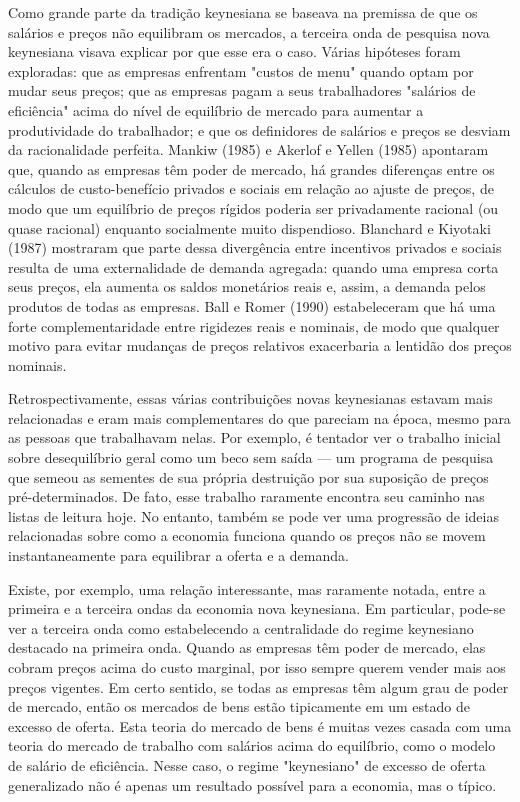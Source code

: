 \documentclass[12pt]{article}
\begin{document}
Como grande parte da tradição keynesiana se baseava na premissa de que os salários e preços não equilibram os mercados, a terceira onda de pesquisa nova keynesiana visava explicar por que esse era o caso. Várias hipóteses foram exploradas: que as empresas enfrentam "custos de menu" quando optam por mudar seus preços; que as empresas pagam a seus trabalhadores "salários de eficiência" acima do nível de equilíbrio de mercado para aumentar a produtividade do trabalhador; e que os definidores de salários e preços se desviam da racionalidade perfeita. Mankiw (1985) e Akerlof e Yellen (1985) apontaram que, quando as empresas têm poder de mercado, há grandes diferenças entre os cálculos de custo-benefício privados e sociais em relação ao ajuste de preços, de modo que um equilíbrio de preços rígidos poderia ser privadamente racional (ou quase racional) enquanto socialmente muito dispendioso. Blanchard e Kiyotaki (1987) mostraram que parte dessa divergência entre incentivos privados e sociais resulta de uma externalidade de demanda agregada: quando uma empresa corta seus preços, ela aumenta os saldos monetários reais e, assim, a demanda pelos produtos de todas as empresas. Ball e Romer (1990) estabeleceram que há uma forte complementaridade entre rigidezes reais e nominais, de modo que qualquer motivo para evitar mudanças de preços relativos exacerbaria a lentidão dos preços nominais.

Retrospectivamente, essas várias contribuições novas keynesianas estavam mais relacionadas e eram mais complementares do que pareciam na época, mesmo para as pessoas que trabalhavam nelas. Por exemplo, é tentador ver o trabalho inicial sobre desequilíbrio geral como um beco sem saída — um programa de pesquisa que semeou as sementes de sua própria destruição por sua suposição de preços pré-determinados. De fato, esse trabalho raramente encontra seu caminho nas listas de leitura hoje. No entanto, também se pode ver uma progressão de ideias relacionadas sobre como a economia funciona quando os preços não se movem instantaneamente para equilibrar a oferta e a demanda.

Existe, por exemplo, uma relação interessante, mas raramente notada, entre a primeira e a terceira ondas da economia nova keynesiana. Em particular, pode-se ver a terceira onda como estabelecendo a centralidade do regime keynesiano destacado na primeira onda. Quando as empresas têm poder de mercado, elas cobram preços acima do custo marginal, por isso sempre querem vender mais aos preços vigentes. Em certo sentido, se todas as empresas têm algum grau de poder de mercado, então os mercados de bens estão tipicamente em um estado de excesso de oferta. Esta teoria do mercado de bens é muitas vezes casada com uma teoria do mercado de trabalho com salários acima do equilíbrio, como o modelo de salário de eficiência. Nesse caso, o regime "keynesiano" de excesso de oferta generalizado não é apenas um resultado possível para a economia, mas o típico.
\end{document}
